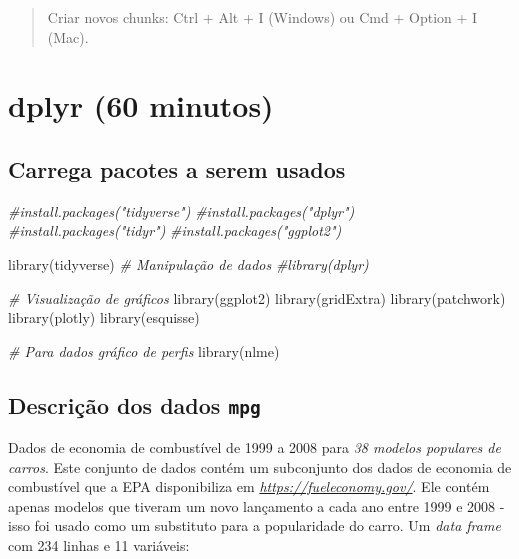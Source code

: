 \documentclass[
]{book}
\newenvironment{Shaded}{\begin{snugshade}}{\end{snugshade}}
\newcommand{\CommentTok}[1]{\textcolor[rgb]{0.56,0.35,0.01}{\textit{#1}}}
\newcommand{\FunctionTok}[1]{\textcolor[rgb]{0.00,0.00,0.00}{#1}}
\newcommand{\NormalTok}[1]{#1}
\begin{document}
\begin{quote}
Criar novos chunks: Ctrl + Alt + I (Windows) ou Cmd + Option + I (Mac).
\end{quote}

\hypertarget{dplyr-60-minutos}{%
\chapter{dplyr (60 minutos)}\label{dplyr-60-minutos}}

\hypertarget{carrega-pacotes-a-serem-usados-1}{%
\section{Carrega pacotes a serem usados}\label{carrega-pacotes-a-serem-usados-1}}

\begin{Shaded}
\begin{Highlighting}[]
\CommentTok{\#install.packages("tidyverse") }
\CommentTok{\#install.packages("dplyr")     }
\CommentTok{\#install.packages("tidyr")     }
\CommentTok{\#install.packages("ggplot2")   }

\FunctionTok{library}\NormalTok{(tidyverse)}
\CommentTok{\# Manipulação de dados}
\CommentTok{\#library(dplyr)}

\CommentTok{\# Visualização de gráficos}
\FunctionTok{library}\NormalTok{(ggplot2)}
\FunctionTok{library}\NormalTok{(gridExtra)}
\FunctionTok{library}\NormalTok{(patchwork)}
\FunctionTok{library}\NormalTok{(plotly)}
\FunctionTok{library}\NormalTok{(esquisse)}

\CommentTok{\# Para dados gráfico de perfis}
\FunctionTok{library}\NormalTok{(nlme)}
\end{Highlighting}
\end{Shaded}

\hypertarget{descriuxe7uxe3o-dos-dados-mpg}{%
\section{\texorpdfstring{Descrição dos dados \texttt{mpg}}{Descrição dos dados mpg}}\label{descriuxe7uxe3o-dos-dados-mpg}}

Dados de economia de combustível de 1999 a 2008 para \emph{38 modelos populares de carros}. Este conjunto de dados contém um subconjunto dos dados de economia de combustível que a EPA disponibiliza em \emph{\url{https://fueleconomy.gov/}}. Ele contém apenas modelos que tiveram um novo lançamento a cada ano entre 1999 e 2008 - isso foi usado como um substituto para a popularidade do carro. Um \emph{data frame} com 234 linhas e 11 variáveis:
\end{document}
